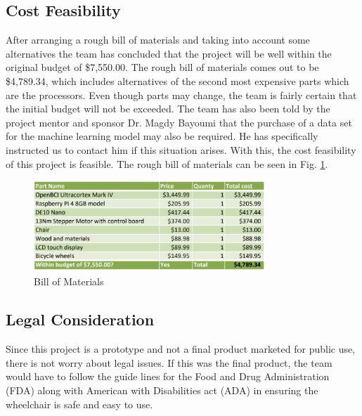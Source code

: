 \documentclass[conference]{IEEEtran}
\begin{document}
        \subsection{Cost Feasibility}
        After arranging a rough bill of materials and taking into account some alternatives the team has concluded that the project will be well within the original budget of \$7,550.00. The rough bill of materials comes out to be {\$4,789.34}, which includes alternatives of the second most expensive parts which are the processors. Even though parts may change, the team is fairly certain that the initial budget will not be exceeded. The team has also been told by the project mentor and sponsor Dr. Magdy Bayoumi that the purchase of a data set for the machine learning model may also be required. He has specifically instructed us to contact him if this situation arises. With this, the cost feasibility of this project is feasible. The rough bill of materials can be seen in Fig. \ref{fig:bom}. 

        \setcounter{figure}{0}
        \renewcommand{\thefigure}{B.\arabic{figure}}
        \begin{figure}
        \centering
        \centerline{\includegraphics[height=1.35in, keepaspectratio]{figs/B/BOM.png}}
            \caption{Bill of Materials}
            \label{fig:bom}
        \end{figure}

        \subsection{Legal Consideration}
        Since this project is a prototype and not a final product marketed for public use, there is not worry about legal issues. If this was the final product, the team would have to follow the guide lines for the Food and Drug Administration (FDA) along with American with Disabilities act (ADA) in ensuring the wheelchair is safe and easy to use.

    \clearpage
    \onecolumn
    
\end{document}
